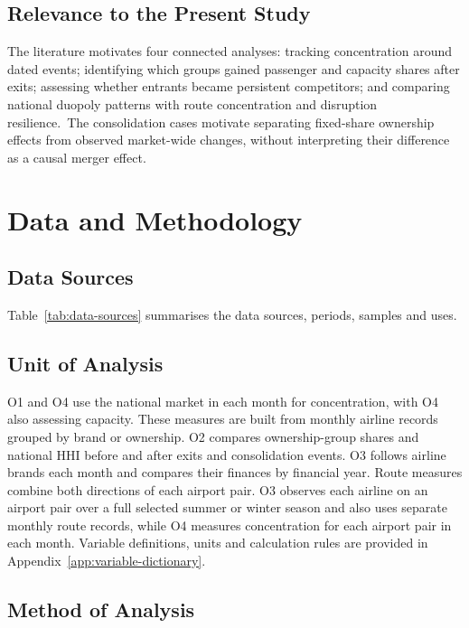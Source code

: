 \documentclass[12pt,a4paper]{article}
\begin{document}
\subsection{Relevance to the Present Study}
The literature motivates four connected analyses: tracking concentration around dated events; identifying which groups gained passenger and capacity shares after exits; assessing whether entrants became persistent competitors; and comparing national duopoly patterns with route concentration and disruption resilience.\ The consolidation cases motivate separating fixed-share ownership effects from observed market-wide changes, without interpreting their difference as a causal merger effect.

\section{Data and Methodology}
\subsection{Data Sources}
Table~\ref{tab:data-sources} summarises the data sources, periods, samples and uses.


\subsection{Unit of Analysis}
O1 and O4 use the national market in each month for concentration, with O4 also assessing capacity. These measures are built from monthly airline records grouped by brand or ownership. O2 compares ownership-group shares and national HHI before and after exits and consolidation events. O3 follows airline brands each month and compares their finances by financial year. Route measures combine both directions of each airport pair. O3 observes each airline on an airport pair over a full selected summer or winter season and also uses separate monthly route records, while O4 measures concentration for each airport pair in each month. Variable definitions, units and calculation rules are provided in Appendix~\ref{app:variable-dictionary}.

\subsection{Method of Analysis}



\end{document}
